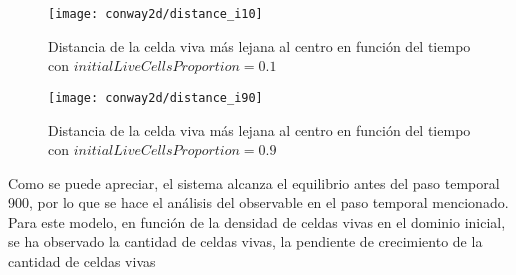 \begin{figure}[H]
    \centering
    \texttt{[image: conway2d/distance\_i10]}
    \caption{Distancia de la celda viva más lejana al centro en función del tiempo con $initialLiveCellsProportion = 0.1$}
    \label{fig:conway2d_d10}
\end{figure}
\begin{figure}[H]
    \centering
    \texttt{[image: conway2d/distance\_i90]}
    \caption{Distancia de la celda viva más lejana al centro en función del tiempo con $initialLiveCellsProportion = 0.9$}
    \label{fig:conway2d_d90}
\end{figure}

Como se puede apreciar, el sistema alcanza el equilibrio antes del paso temporal 900, por lo que se hace el análisis
del observable en el paso temporal mencionado.
Para este modelo, en función de la densidad de celdas vivas en el dominio inicial, se ha observado la cantidad de celdas vivas,
la pendiente de crecimiento de la cantidad de celdas vivas

